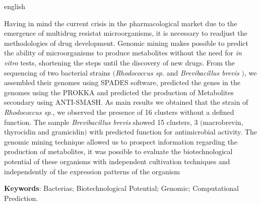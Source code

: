 \begin{resumo}[Abstract]
 \begin{otherlanguage*}{english}

   Having in mind the current crisis in the pharmacological market due to the emergence of
   multidrug resistat microorganisms, it is necessary to readjust the methodologies of drug development.
   Genomic mining makes possible to predict the ability of microorganisms to produce
   metabolites without the need for \textit{in vitro} tests, shortening the steps
   until the discovery of new drugs. From the sequencing of two
   bacterial strains $($\textit{Rhodococcus sp.} and \textit{Brevibacillus brevis} $)$, we
   assembled their genomes using SPADES software, predicted the genes in the
   genomes using the PROKKA and predicted the production of Metabolites
   secondary using ANTI-SMASH. As main results we obtained that the strain
   of \textit{Rhodococcus sp.}, we observed the presence of 16 clusters without a defined function.
   The sample \textit{Brevibacillus brevis} showed 15 clusters, 3 $($macrobrevin, thyrocidin and gramicidin$)$ with predicted function
   for antimicrobial activity. The genomic mining technique allowed us to prospect information
   regarding the production of metabolites, it was possible to evaluate the biotechnological potential
   of these organisms with independent cultivation techniques and independently of the
   expression patterns of the organism

   \vspace{\onelineskip}
   \noindent 
   \textbf{Keywords}: Bacterias; Biotechnological Potential; Genomic; Computational Prediction.
 \end{otherlanguage*}
\end{resumo}

% 

%  
